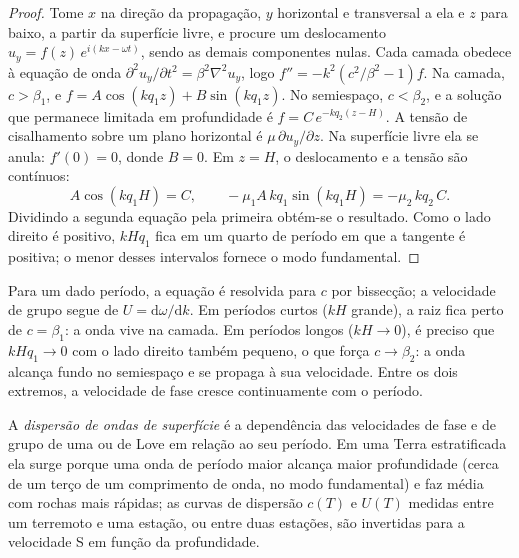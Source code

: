 \begin{proof}
Tome $x$ na direção da propagação, $y$ horizontal e transversal a ela e $z$ para baixo, a partir da
superfície livre, e procure um deslocamento
$u_y = f(z)\,e^{i(kx - \omega t)}$, sendo as demais componentes nulas. Cada camada
obedece à equação de onda $\partial^2 u_y/\partial t^2 = \beta^2\nabla^2 u_y$, logo
$f'' = -k^2\left(c^2/\beta^2 - 1\right) f$. Na camada, $c > \beta_1$, e
$f = A\cos(kq_1z) + B\sin(kq_1z)$. No semiespaço, $c < \beta_2$, e a
solução que permanece limitada em profundidade é $f = C\,e^{-kq_2(z - H)}$.
A tensão de cisalhamento sobre um plano horizontal é $\mu\,\partial u_y/\partial z$.
Na superfície livre ela se anula: $f'(0) = 0$, donde $B = 0$. Em $z = H$, o
deslocamento e a tensão são contínuos:
\[
  A\cos(kq_1H) = C, \qquad -\mu_1 A\,kq_1\sin(kq_1H) = -\mu_2\,kq_2\,C .
\]
Dividindo a segunda equação pela primeira obtém-se o resultado. Como o
lado direito é positivo, $kHq_1$ fica em um quarto de período em que a
tangente é positiva; o menor desses intervalos fornece o modo fundamental.
\end{proof}

Para um dado período, a equação é resolvida para $c$ por bissecção; a
velocidade de grupo segue de $U = \mathrm d\omega/\mathrm dk$. Em períodos curtos
($kH$ grande), a raiz fica perto de $c = \beta_1$: a onda vive na camada. Em
períodos longos ($kH \to 0$), é preciso que $kHq_1 \to 0$ com o lado direito
também pequeno, o que força $c \to \beta_2$: a onda alcança fundo no semiespaço e
se propaga à sua velocidade. Entre os dois extremos, a velocidade de fase cresce
continuamente com o período.

\begin{definition}\label{def:b3:seismology-imaging:dispersion}
A \emph{dispersão de ondas de superfície} é a dependência
das velocidades de fase e de grupo de uma  ou de Love em relação ao seu período. Em
uma Terra estratificada ela surge porque uma onda de período maior alcança maior profundidade
(cerca de um terço de um comprimento de onda, no modo fundamental) e faz média com rochas mais
rápidas; as curvas de dispersão $c(T)$ e $U(T)$ medidas entre um terremoto
e uma estação, ou entre duas estações, são invertidas para a velocidade S em
função da profundidade.
\end{definition}

